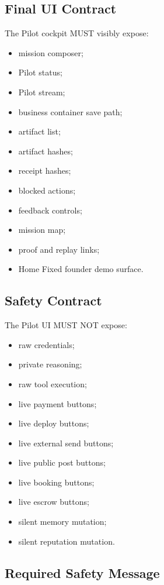 \subsection{Final UI Contract}

The Pilot cockpit MUST visibly expose:

\begin{itemize}
  \item mission composer;
  \item Pilot status;
  \item Pilot stream;
  \item business container save path;
  \item artifact list;
  \item artifact hashes;
  \item receipt hashes;
  \item blocked actions;
  \item feedback controls;
  \item mission map;
  \item proof and replay links;
  \item Home Fixed founder demo surface.
\end{itemize}

\subsection{Safety Contract}

The Pilot UI MUST NOT expose:

\begin{itemize}
  \item raw credentials;
  \item private reasoning;
  \item raw tool execution;
  \item live payment buttons;
  \item live deploy buttons;
  \item live external send buttons;
  \item live public post buttons;
  \item live booking buttons;
  \item live escrow buttons;
  \item silent memory mutation;
  \item silent reputation mutation.
\end{itemize}

\subsection{Required Safety Message}

